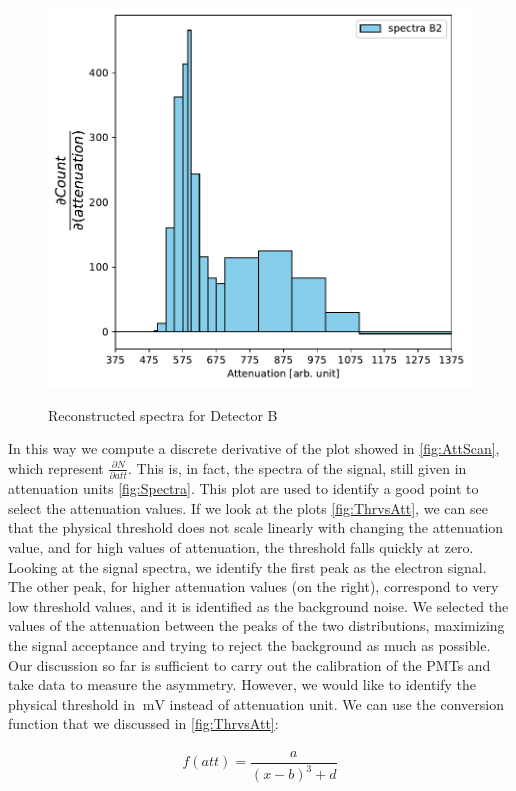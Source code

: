 \begin{figure}
{\includegraphics[scale = 0.5]{Analysis/CalibrationPMT/B2.pdf}}
\caption{Reconstructed spectra for Detector B}
\end{figure}

In this way we compute a discrete derivative of the plot showed in \ref{fig:AttScan}, which represent $\frac{\partial N}{\partial att}$. This is, in fact, the spectra of the signal, still given in attenuation units \ref{fig:Spectra}.
This plot are used to identify a good point to select the attenuation values. If we look at the plots \ref{fig:ThrvsAtt}, we can see that the physical threshold does not scale linearly with changing the attenuation value, and for high values of attenuation, the threshold falls quickly at zero. 
Looking at the signal spectra, we identify the first peak as the electron signal. The other peak, for higher attenuation values (on the right), correspond to very low threshold values, and it is identified as the background noise. 
We selected the values of the attenuation between the peaks of the two distributions, maximizing the signal acceptance and trying to reject the background as much as possible.
Our discussion so far is sufficient to carry out the calibration of the PMTs and take data to measure the asymmetry. However, we would like to identify the physical threshold in $\SI{}{\milli \volt}$ instead of attenuation unit. We can use the conversion function that we discussed in \ref{fig:ThrvsAtt}:

\begin{align*}
f(att) = \dfrac{a}{(x - b)^{3} + d}
\end{align*} 


